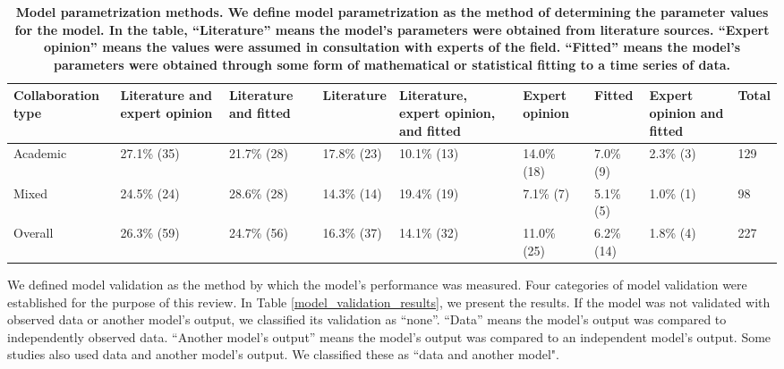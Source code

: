 \documentclass[10pt,letterpaper]{article}
\begin{document}
\begin{table}[!h]
\setlength\arrayrulewidth{1pt} 
\centering
\caption{\bf Model parametrization methods. We define model parametrization as the method of determining the parameter values for the model. In the table, ``Literature'' means the model's parameters were obtained from literature sources. ``Expert opinion'' means the values were assumed in consultation with experts of the field. ``Fitted'' means the model’s parameters were obtained through some form of mathematical or statistical fitting to a time series of data. }
\begin{adjustwidth}{-2.10in}{0in}
\begin{tabular}{| p{}  p{}  p{}  p{}  p{}  p{}  p{}  p{}  p{} |} \hline 
\textbf{Collaboration type} & \textbf{Literature and expert opinion} & \textbf{Literature and fitted} & \textbf{Literature} &  \textbf{Literature, expert opinion, and fitted} & \textbf{Expert opinion} & \textbf{Fitted} & \textbf{Expert opinion and fitted} & \textbf{Total} \\ \hline
Academic & 27.1\% (35) & 21.7\% (28) & 17.8\% (23) & 10.1\% (13) & 14.0\% (18)  & 7.0\% (9) & 2.3\% (3) & 129 \\ \hline
Mixed & 24.5\% (24) & 28.6\% (28) & 14.3\% (14) & 19.4\% (19) & 7.1\% (7) & 5.1\% (5) & 1.0\% (1) & 98 \\ \hline \rowcolor{gray!20}
Overall & 26.3\% (59) & 24.7\% (56) & 16.3\% (37) & 14.1\% (32) & 11.0\% (25) & 6.2\% (14) & 1.8\% (4) & 227 \\ \hline 
\end{tabular}
\end{adjustwidth}
\label{model_parametrization_results}
\end{table}

We defined model validation as the method by which the model's performance was measured. Four categories of model validation were established for the purpose of this review. In Table \ref{model_validation_results}, we present the results. If the model was not validated with observed data or another model's output, we classified its validation as ``none''.  ``Data'' means the model's output was compared to independently observed data. ``Another model’s output'' means the model's output was compared to an independent model's output. Some studies also used data and another model's output. We classified these as ``data and another model".
\end{document}
